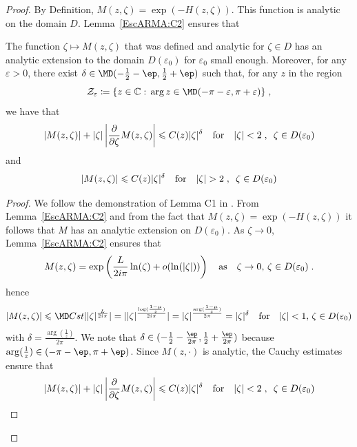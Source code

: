 \begin{proof}
By Definition, $ M(z, \zeta) = \exp(-H(z, \zeta))$. This function is analytic on the domain $D$. Lemma~\ref{EscARMA:C2} ensures that

\begin{lemma}\label{prop:cptM}The function $\zeta \mapsto M(z,\zeta)$ that was defined and analytic for $\zeta \in D$ has an analytic extension to the domain $D(\varepsilon_0)$ for $\varepsilon_0$ small enough. Moreover, for any $\varepsilon > 0$, there exist $\delta \in {\MD (-\f{1}{2}-\ep,\f{1}{2}+\ep)}$ such that, for any $z$ in the region
    $$ \Zcal_\varepsilon \coloneqq \{ z \in \CC :\, \arg z \in {\MD (-\pi-\varepsilon, \pi +\varepsilon)}\} \eqfinv$$ we have that 
    \begin{equation}
        |M(z, \zeta)| + |\zeta|\left| \frac{\partial}{\partial \zeta}M(z,\zeta)\right|
        \leqslant 
        C(z) |\zeta|^\delta \quad \text{for} \quad |\zeta| < 2 \; , \enspace \zeta \in D(\varepsilon_0)
    \end{equation}
    and 
    \begin{equation}
        |M(z,\zeta)| \leqslant C(z)|\zeta|^{\delta} \quad \text{for} \quad |\zeta| > 2 \; , \enspace \zeta \in D(\varepsilon_0)
    \end{equation}
\end{lemma}
\begin{proof}We follow the demonstration of Lemma C1 in \cite{escobedo2007fundamental}. From Lemma~\ref{EscARMA:C2} and from the fact that $M(z, \zeta) = \exp(-H(z,\zeta))$ it follows that $M$ has an analytic extension on $D(\varepsilon_0)$.
As $\zeta \to 0$, Lemma~\ref{EscARMA:C2} ensures that 
$$ M(z, \zeta) = \exp\left(\frac{L}{2i\pi } \ln(\zeta) + o(\ln(|\zeta|)) \right)  \quad \text{as} \quad \zeta\to 0,\, \zeta \in D(\varepsilon_0) \; .$$
hence
$$ \vert {M(z,\zeta)}{} \vert \leq {\MD Cst} \vert {|\zeta|^{\frac{L}{2i\pi}}}\vert=
\vert |\zeta|^{\frac{\log(\frac{1-\mu}{z})}{2i\pi}}\vert = \vert \zeta \vert^{\frac{\arg (\frac{1-\mu}{z})}{2\pi}}=\vert \zeta \vert^\delta
\mtext{for}  \vert \zeta \vert < 1,\, \zeta \in D(\varepsilon_0)$$ with 
 $\delta = \frac{\arg(\frac{1}{z})}{2\pi}$. We note that {\MD $\delta \in (-\f{1}{2}-\f{\ep}{2\pi},\f{1}{2}+\f{\ep}{2\pi})$ because $\arg(\frac{1}{z}) \in (-\pi-\ep, \pi+\ep)$}.
Since $M(z, \cdot)$ is analytic, the Cauchy estimates ensure that 
\begin{equation*}
    |M(z, \zeta)| + |\zeta|\left| \frac{\partial}{\partial \zeta}M(z,\zeta)\right|
    \leqslant 
    C(z) |\zeta|^\delta \quad \text{for} \quad |\zeta| < 2 \; , \enspace \zeta \in D(\varepsilon_0)
\end{equation*}


\end{proof}
\end{proof}
